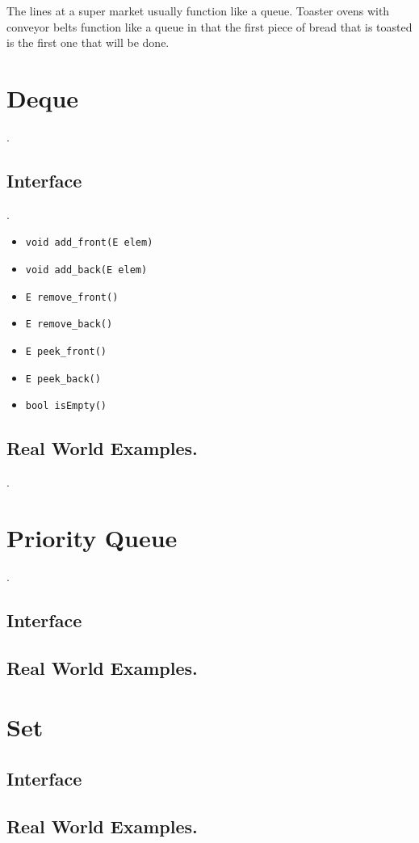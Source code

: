 \documentclass[12pt, letterpaper]{book}
\begin{document}
The lines at a super market usually function like a queue. Toaster ovens with conveyor belts function like a queue in that the first piece of bread that is toasted is the first one that will be done.

\section{Deque}.
	\subsection{Interface}.

\begin{itemize}
\item \texttt{void add\_front(E elem)}
\item \texttt{void add\_back(E elem)}
\item \texttt{E  remove\_front()}
\item \texttt{E  remove\_back()}
\item \texttt{E  peek\_front()}
\item \texttt{E  peek\_back()}
\item \texttt{bool isEmpty()}
\end{itemize}

	\subsection{Real World Examples.}.
\section{Priority Queue}.
	\subsection{Interface}
	\subsection{Real World Examples.}
\section{Set}
	\subsection{Interface}
	\subsection{Real World Examples.}
\end{document}

